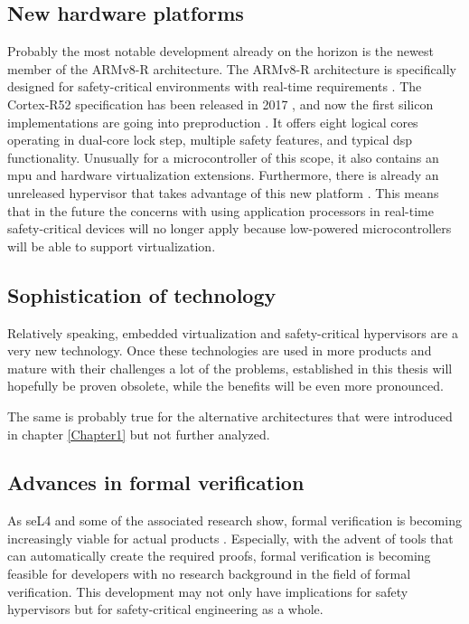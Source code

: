 \subsection{New hardware platforms} \label{cortex-r52-hypervisor}
Probably the most notable development already on the horizon is the newest member of the ARMv8-R architecture. The ARMv8-R architecture is specifically designed for safety-critical environments with real-time requirements \cite{armr}. 
The Cortex-R52 specification has been released in 2017 \cite{armcortexr52}, and now the first silicon implementations are going into preproduction \cite{nxp}. It offers eight logical cores operating in dual-core lock step, multiple safety features, and typical \acrshort{dsp} functionality. Unusually for a microcontroller of this scope, it also contains an \acrshort{mpu} and hardware virtualization extensions. Furthermore, there is already an unreleased hypervisor that takes advantage of this new platform \cite{opensynergy}. This means that in the future the concerns with using application processors in real-time safety-critical devices will no longer apply because low-powered microcontrollers will be able to support virtualization.

\subsection{Sophistication of technology}
Relatively speaking, embedded virtualization and safety-critical hypervisors are a very new technology. Once these technologies are used in more products and mature with their challenges a lot of the problems, established in this thesis will hopefully be proven obsolete, while the benefits will be even more pronounced. 

The same is probably true for the alternative architectures that were introduced in chapter \ref{Chapter1} but not further analyzed.
\subsection{Advances in formal verification}
As seL4 and some of the associated research show, formal verification is becoming increasingly viable for actual products \cite{sel4faq}. Especially, with the advent of tools that can automatically create the required proofs, formal verification is becoming feasible for developers with no research background in the field of formal verification. This development may not only have implications for safety hypervisors but for safety-critical engineering as a whole.

